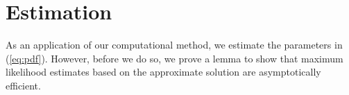 \documentclass[10pt]{article}
\begin{document}



\section{Estimation}
As an application of our computational method, we estimate the
parameters in (\ref{eq:pdf}). However, before we do so, we prove a
lemma to show that maximum likelihood estimates based on the
approximate solution are asymptotically efficient.
\end{document}

